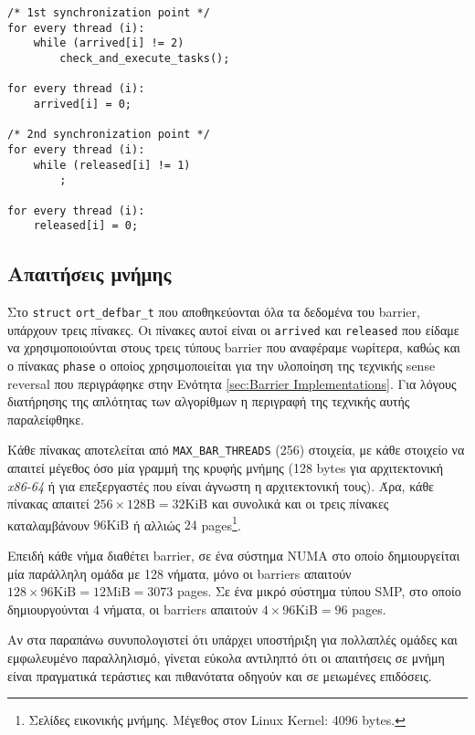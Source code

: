 \begin{lstlisting}[label=prg:tb2, caption=Task barrier για το νήμα-αρχηγό.]
/* 1st synchronization point */
for every thread (i):
    while (arrived[i] != 2)
        check_and_execute_tasks();
        
for every thread (i):
    arrived[i] = 0;
   
/* 2nd synchronization point */
for every thread (i):
    while (released[i] != 1)
        ;
        
for every thread (i):
    released[i] = 0;
\end{lstlisting}


\subsection{Απαιτήσεις μνήμης}
\label{ssec:Memory requirements of OMPi's barrier}
Στο \texttt{struct} \texttt{ort\_defbar\_t} που αποθηκεύονται όλα τα δεδομένα του barrier, υπάρχουν τρεις πίνακες. Οι πίνακες αυτοί είναι οι \texttt{arrived} και \texttt{released} που είδαμε να χρησιμοποιούνται στους τρεις τύπους barrier που αναφέραμε νωρίτερα, καθώς και ο πίνακας \texttt{phase} ο οποίος χρησιμοποιείται για την υλοποίηση της τεχνικής sense reversal που περιγράφηκε στην Ενότητα \ref{sec:Barrier Implementations}. Για λόγους διατήρησης της απλότητας των αλγορίθμων η περιγραφή της τεχνικής αυτής παραλείφθηκε.

Κάθε πίνακας αποτελείται από \texttt{MAX\_BAR\_THREADS} (256) στοιχεία, με κάθε στοιχείο να απαιτεί μέγεθος όσο μία γραμμή της κρυφής μνήμης (128 bytes για αρχιτεκτονική \textit{x86-64} ή για επεξεργαστές που είναι άγνωστη η αρχιτεκτονική τους). Άρα, κάθε πίνακας απαιτεί $256 \times 128 \mbox{B} = 32 \mbox{KiB}$ και συνολικά και οι τρεις πίνακες καταλαμβάνουν $96 \mbox{KiB}$ ή αλλιώς $24$ pages\footnote{Σελίδες εικονικής μνήμης. Mέγεθος στον Linux Kernel: 4096 bytes.}.

Επειδή κάθε νήμα διαθέτει barrier, σε ένα σύστημα NUMA στο οποίο δημιουργείται μία παράλληλη ομάδα με 128 νήματα, μόνο οι barriers απαιτούν $128 \times 96 \mbox{KiB} = 12 \mbox{MiB} = 3073$ pages. Σε ένα μικρό σύστημα τύπου SMP, στο οποίο δημιουργούνται 4 νήματα, οι barriers απαιτούν $4 \times 96 \mbox{KiB} = 96$ pages.

Αν στα παραπάνω συνυπολογιστεί ότι υπάρχει υποστήριξη για πολλαπλές ομάδες και εμφωλευμένο παραλληλισμό, γίνεται εύκολα αντιληπτό ότι οι απαιτήσεις σε μνήμη είναι πραγματικά τεράστιες και πιθανότατα οδηγούν και σε μειωμένες επιδόσεις.

